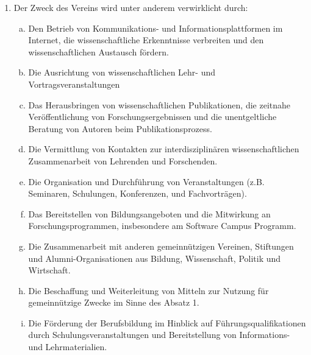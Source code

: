 \documentclass{article}
\begin{document}
\begin{enumerate}[§ 1.]
\begin{enumerate}[1.]
	\item Der Zweck des Vereins wird unter anderem verwirklicht durch:
		\begin{enumerate}[a.]
		\item Den Betrieb von Kommunikations- und Informationsplattformen im Internet,
			die wissenschaftliche Erkenntnisse verbreiten und den wissenschaftlichen Austausch fördern.
		\item Die Ausrichtung von wissenschaftlichen Lehr- und Vortragsveranstaltungen
		\item Das Herausbringen von wissenschaftlichen Publikationen, die zeitnahe Veröffentlichung von Forschungsergebnissen und die unentgeltliche Beratung von Autoren beim Publikationsprozess.
		\item Die Vermittlung von Kontakten zur interdisziplinären wissenschaftlichen Zusammenarbeit von Lehrenden und Forschenden.
		\item Die Organisation und Durchführung von Veranstaltungen
			(z.B. Seminaren, Schulungen, Konferenzen, und Fachvorträgen).
		\item Das Bereitstellen von Bildungsangeboten und die Mitwirkung an Forschungsprogrammen, insbesondere am Software Campus Programm.
		\item Die Zusammenarbeit mit anderen gemeinnützigen Vereinen, Stiftungen und Alumni-Organisationen
			aus Bildung, Wissenschaft, Politik und Wirtschaft.
		\item Die Beschaffung und Weiterleitung von Mitteln zur Nutzung für gemeinnützige Zwecke im Sinne des Absatz 1.
		\item Die Förderung der Berufsbildung im Hinblick auf Führungsqualifikationen durch Schulungsveranstaltungen
			und Bereitstellung von Informations- und Lehrmaterialien.
		\end{enumerate}
	\end{enumerate}


\end{enumerate}
\end{document}
